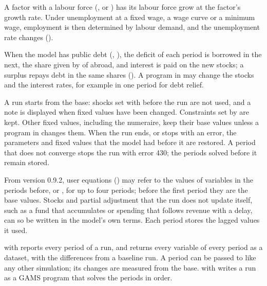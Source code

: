 
A factor with a labour force (,  or
) has its labour force grow at the factor's growth rate. Under
unemployment at a fixed wage, a wage curve or a minimum wage, employment is
then determined by labour demand, and the unemployment rate changes
().


When the model has public debt (, ), the
deficit of each period is borrowed in the next, the share given by
 of  abroad, and interest is paid
on the new stocks; a surplus repays debt in the same shares
(). A program in  may change the stocks and the
interest rates, for example  in one period for
debt relief.


A run starts from the base: shocks set with  before the run
are not used, and a note is displayed when fixed values have been changed.
Constraints set by  are kept. Other fixed values,
including the numeraire, keep their base values unless a program in
 changes them. When the run ends, or stops with an error, the
parameters and fixed values that the model had before it are restored. A
period that does not converge stops the run with error 430; the periods
solved before it remain stored.


From version 0.9.2, user equations () may refer to the
values of variables in the periods before,  or
, for up to four periods; before the first period
they are the base values. Stocks and partial adjustment that the run does not
update itself, such as a fund that accumulates or spending that follows
revenue with a delay, can so be written in the model's own terms. Each period
stores the lagged values it used.


 with  reports every period of a run, and
 returns every variable of every period as a dataset,
with the differences from a baseline run. A period can be passed to
 like any other simulation; its changes are measured from
the base. \mbox{} with  writes a run as a GAMS
program that solves the periods in order.

